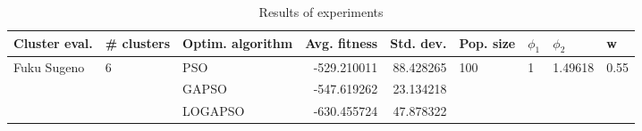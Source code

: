 \begin{table}
\centering
\caption{Results of experiments}
\begin{tabular}{lllrrllll}
\toprule
               Cluster eval. &        \# clusters & Optim. algorithm &  Avg. fitness &  Std. dev. &            Pop. size &         $\phi_{1}$ &               $\phi_{2}$ &                     w \\
\midrule
\multirow{3}{*}{Fuku Sugeno} & \multirow{3}{*}{6} &              PSO &   -529.210011 &  88.428265 & \multirow{3}{*}{100} & \multirow{3}{*}{1} & \multirow{3}{*}{1.49618} & \multirow{3}{*}{0.55} \\
                             &                    &            GAPSO &   -547.619262 &  23.134218 &                      &                    &                          &                       \\
                             &                    &          LOGAPSO &   -630.455724 &  47.878322 &                      &                    &                          &                       \\
\bottomrule
\end{tabular}
\end{table}
